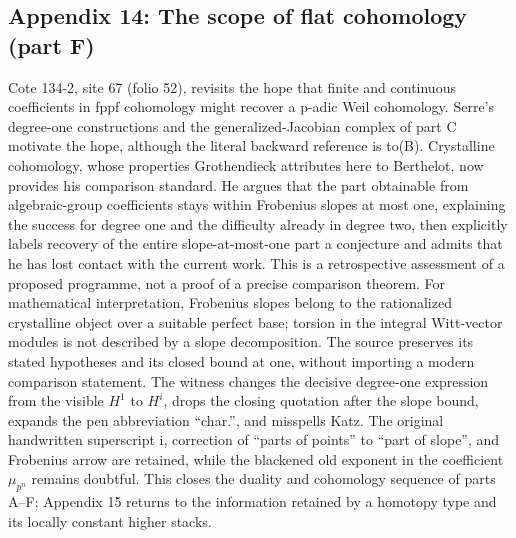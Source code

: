 \documentclass[10pt,oneside]{book}
\begin{document}
\subsection*{Appendix 14: The scope of flat cohomology (part F)}
Cote 134-2, site 67 (folio 52), revisits the hope that finite and continuous coefficients in fppf cohomology might recover a p-adic Weil cohomology. Serre's degree-one constructions and the generalized-Jacobian complex of part C motivate the hope, although the literal backward reference is to(B). Crystalline cohomology, whose properties Grothendieck attributes here to Berthelot, now provides his comparison standard. He argues that the part obtainable from algebraic-group coefficients stays within Frobenius slopes at most one, explaining the success for degree one and the difficulty already in degree two, then explicitly labels recovery of the entire slope-at-most-one part a conjecture and admits that he has lost contact with the current work. This is a retrospective assessment of a proposed programme, not a proof of a precise comparison theorem. For mathematical interpretation, Frobenius slopes belong to the rationalized crystalline object over a suitable perfect base; torsion in the integral Witt-vector modules is not described by a slope decomposition. The source preserves its stated hypotheses and its closed bound at one, without importing a modern comparison statement. The witness changes the decisive degree-one expression from the visible $H^1$ to $H^i$, drops the closing quotation after the slope bound, expands the pen abbreviation ``char.'', and misspells Katz. The original handwritten superscript i, correction of ``parts of points'' to ``part of slope'', and Frobenius arrow are retained, while the blackened old exponent in the coefficient $\mu_{p^n}$ remains doubtful. This closes the duality and cohomology sequence of parts A--F; Appendix 15 returns to the information retained by a homotopy type and its locally constant higher stacks.
\end{document}
